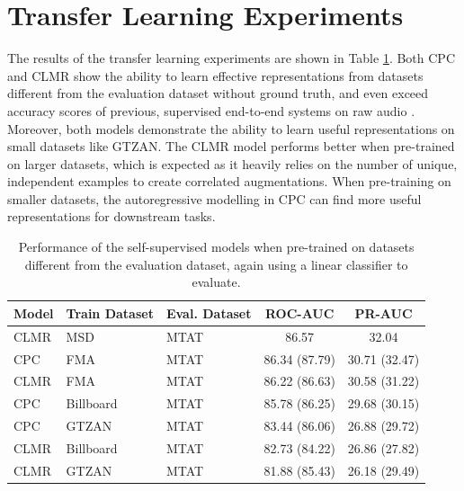 \section{Transfer Learning Experiments}
The results of the transfer learning experiments are shown in Table \ref{tab:magnatagatune_results}.
Both CPC and CLMR show the ability to learn effective representations from datasets different from the evaluation dataset without ground truth, and even exceed accuracy scores of previous, supervised end-to-end systems on raw audio \cite{dieleman2014end}.
Moreover, both models demonstrate the ability to learn useful representations on small datasets like GTZAN.
The CLMR model performs better when pre-trained on larger datasets, which is expected as it heavily relies on the number of unique, independent examples to create correlated augmentations.
When pre-training on smaller datasets, the autoregressive modelling in CPC can find more useful representations for downstream tasks.

\begin{table}[h]
    \centering
    \begin{tabular}{@{}lllcc@{}}\toprule
        Model & Train Dataset & Eval.
        Dataset &  ROC-AUC & PR-AUC \\ \midrule
        CLMR & MSD & MTAT &  86.57 & 32.04 \\
        CPC & FMA & MTAT & 86.34 (87.79) & 30.71 (32.47) \\
        CLMR & FMA & MTAT & 86.22 (86.63) & 30.58 (31.22) \\
        CPC & Billboard & MTAT & 85.78 (86.25) & 29.68 (30.15) \\
        CPC & GTZAN & MTAT & 83.44 (86.06) & 26.88 (29.72) \\
        CLMR & Billboard & MTAT & 82.73 (84.22) & 26.86 (27.82) \\
        CLMR & GTZAN & MTAT & 81.88 (85.43) & 26.18 (29.49) \\
        \bottomrule
    \end{tabular}
    \caption{Performance of the self-supervised models when pre-trained on datasets different from the evaluation dataset, again using a linear classifier to evaluate.}
    \label{tab:magnatagatune_results}
\end{table}


